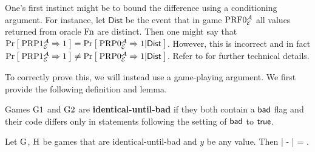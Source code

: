 One's first instinct might be to bound the difference using a conditioning argument. For instance, let $\mathsf{Dist}$ be the event that in game $\textnormal{PRF}0_{{\cal E}}^{\mathcal A}$ all values returned from oracle $\textnormal{Fn}$ are distinct. Then one might say that $\Pr\left[\: \textnormal{PRP}1_{\cal E}^{\mathcal A}\Rightarrow 1 \:\right] =   \Pr\left[\: \textnormal{PRP}0_{\cal E}^{\mathcal A}\Rightarrow1 | \mathsf{Dist} \:\right]$. However, this is incorrect and in fact $\Pr\left[\: \textnormal{PRP}1_{\cal E}^{\mathcal A}\Rightarrow 1 \:\right] \neq   \Pr\left[\: \textnormal{PRP}0_{\cal E}^{\mathcal A}\Rightarrow1 | \mathsf{Dist} \:\right]$. Refer to \cite{bellare2006multi} for further technical details. 

To correctly prove this, we will instead use a game-playing argument. We first provide the following definition and lemma.

\begin{definition}
	Games ${{\textnormal G}}1$ and ${{\textnormal G}}2$ are \textbf{identical-until-bad} if they both contain a $\mathsf{bad}$ flag and their code differs only in statements following the setting of $\mathsf{bad}$ to $\mathsf{true}$. 
\end{definition} 

\begin{lem}
	Let ${{\textnormal G}}$, ${{\textnormal H}}$ be games that are identical-until-bad and $y$ be any
	value. Then
	\bnm
	\big|  
	-  \big| \le \Prob{\Hgame\setsbad} = \Prob{\G\setsbad}  \;.
	\enm
\end{lem}

